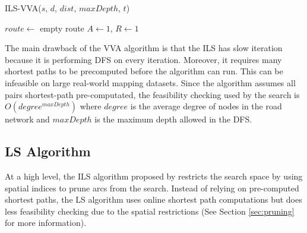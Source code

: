 \documentclass[11pt]{article}
\newcommand{\td}{\todo[inline]}
\begin{document}
%
%
\begin{algorithm}[!h ]
    \caption{ILS-VVA($s$, $d$, $dist$, $maxDepth$, $t$) \label{alg:ils-ver}}
    
    $route \gets$ empty route\;
    $A \gets 1$, $R \gets 1$\;
    
    
\end{algorithm}

The main drawback of the VVA algorithm is that the ILS has slow iteration because it is performing DFS on every iteration.  Moreover, it requires many shortest paths to be precomputed before the algorithm can run. This can be infeasible on large real-world  mapping datasets. Since the algorithm assumes all pairs shortest-path pre-computated, the feasibility checking used by the search is $O(degree^{maxDepth})$ where $degree$ is the average degree of nodes in the road network and $maxDepth$ is the maximum depth allowed in the DFS.

\subsection{LS Algorithm}
At a high level, the ILS algorithm proposed by \citeauthor{lu2015arc} restricts the search space by using spatial indices to prune arcs from the search. Instead of relying on pre-computed shortest paths, the LS algorithm uses online shortest path computations but does less feasibility checking due to the spatial restrictions (See Section \ref{sec:pruning} for more information).
\end{document}
